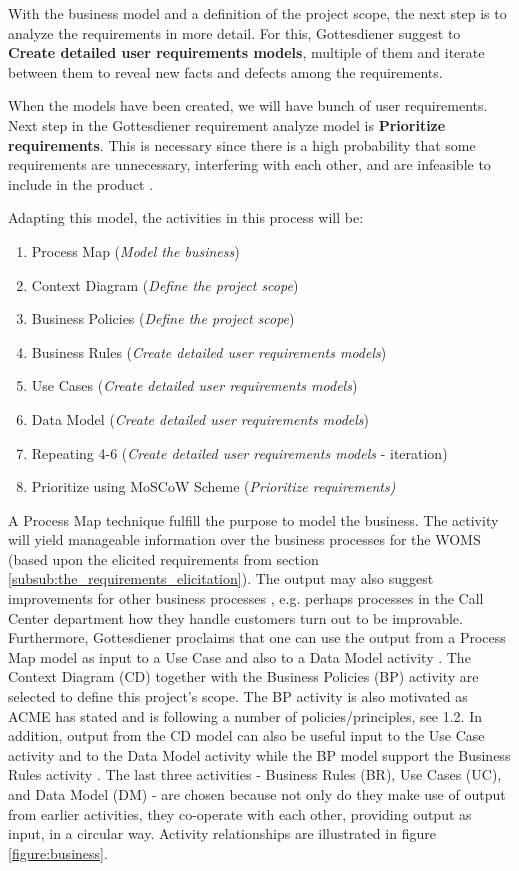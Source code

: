 \documentclass[a4paper]{article}
\begin{document}
With the business model and a definition of the project scope, the next step is to analyze the requirements in more detail. For this, Gottesdiener suggest to \textbf{Create detailed user requirements models}, multiple of them and iterate between them to reveal new facts and defects among the requirements.
        
When the models have been created, we will have bunch of user requirements. Next step in the Gottesdiener requirement analyze model is \textbf{Prioritize requirements}. This is necessary since there is a high probability that some requirements are unnecessary, interfering with each other, and are infeasible to include in the product \cite{Lec5}.  

Adapting this model, the activities in this process will be:
\begin{enumerate}
\item Process Map (\emph{Model the business}) 
\item Context Diagram (\emph{Define the project scope})
\item Business Policies (\emph{Define the project scope})
\item Business Rules (\emph{Create detailed user requirements models})
\item Use Cases (\emph{Create detailed user requirements models})
\item Data Model (\emph{Create detailed user requirements models})
\item Repeating 4-6 (\emph{Create detailed user requirements models} - iteration)
\item Prioritize using MoSCoW Scheme (\emph{Prioritize requirements)}
\end{enumerate}



A Process Map technique fulfill the purpose to model the business. The activity will yield manageable information over the business processes for the WOMS (based upon the elicited requirements from section \ref{subsub:the_requirements_elicitation}). The output may also suggest improvements for other business processes \cite{gott4}, e.g. perhaps processes in the Call Center department how they handle customers turn out to be improvable. Furthermore, Gottesdiener proclaims that one can use the output from a Process Map model as input to a Use Case and also to a Data Model activity \cite{gott4}.
      The Context Diagram (CD) together with the Business Policies (BP) activity are selected to define this project's scope. The BP activity is also motivated as ACME has stated and is following a number of policies/principles, see 1.2. In addition, output from the CD model can also be useful input to the Use Case activity and to the Data Model activity\cite{gott4} while the BP model support the Business Rules activity \cite{gott4}.
     The last three activities - Business Rules (BR), Use Cases (UC), and Data Model (DM) - are chosen because not only do they make use of output from earlier activities, they co-operate with each other, providing output as input, in a circular way. Activity relationships are illustrated in figure \ref{figure:business}.
     
\end{document}
